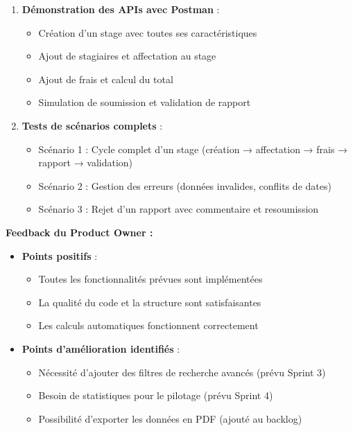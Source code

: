 \documentclass[12pt,a4paper]{report}
\begin{document}
\begin{enumerate}[leftmargin=1cm]
    \item \textbf{Démonstration des APIs avec Postman} :
    \begin{itemize}
        \item Création d'un stage avec toutes ses caractéristiques
        \item Ajout de stagiaires et affectation au stage
        \item Ajout de frais et calcul du total
        \item Simulation de soumission et validation de rapport
    \end{itemize}
    
    \item \textbf{Tests de scénarios complets} :
    \begin{itemize}
        \item Scénario 1 : Cycle complet d'un stage (création → affectation → frais → rapport → validation)
        \item Scénario 2 : Gestion des erreurs (données invalides, conflits de dates)
        \item Scénario 3 : Rejet d'un rapport avec commentaire et resoumission
    \end{itemize}
\end{enumerate}

\textbf{Feedback du Product Owner :}

\begin{itemize}[leftmargin=1cm]
    \item \textbf{Points positifs} :
    \begin{itemize}
        \item Toutes les fonctionnalités prévues sont implémentées
        \item La qualité du code et la structure sont satisfaisantes
        \item Les calculs automatiques fonctionnent correctement
    \end{itemize}
    
    \item \textbf{Points d'amélioration identifiés} :
    \begin{itemize}
        \item Nécessité d'ajouter des filtres de recherche avancés (prévu Sprint 3)
        \item Besoin de statistiques pour le pilotage (prévu Sprint 4)
        \item Possibilité d'exporter les données en PDF (ajouté au backlog)
    \end{itemize}
\end{itemize}
\end{document}
